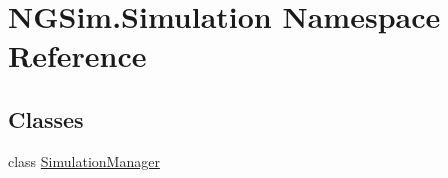 \hypertarget{namespace_n_g_sim_1_1_simulation}{}\section{N\+G\+Sim.\+Simulation Namespace Reference}
\label{namespace_n_g_sim_1_1_simulation}
\subsection*{Classes}
\begin{DoxyCompactItemize}
\item 
class \hyperlink{class_n_g_sim_1_1_simulation_1_1_simulation_manager}{Simulation\+Manager}
\end{DoxyCompactItemize}
